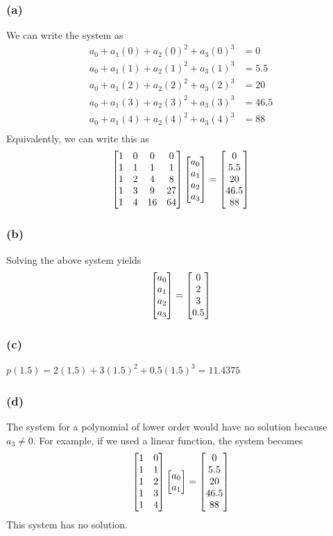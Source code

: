 \documentclass{article}
\begin{document}
\subsubsection*{(a)}
We can write the system as
\begin{align*}
a_0+a_1(0)+a_2(0)^2 +a_3(0)^3 &= 0 \\
a_0+a_1(1)+a_2(1)^2 +a_3(1)^3 &= 5.5 \\
a_0+a_1(2)+a_2(2)^2 +a_3(2)^3&= 20  \\
a_0+a_1(3)+a_2(3)^2 +a_3(3)^3 &= 46.5 \\
a_0+a_1(4)+a_2(4)^2 +a_3(4)^3 &= 88 \\ 
\end{align*}
Equivalently, we can write this as
\begin{align*}
\begin{bmatrix}
1 & 0 & 0 & 0 \\
1 & 1 &1 &1\\
1&2&4&8\\ 
1&3&9&27\\ 
1&4&16&64\\ 
 \end{bmatrix}
 \begin{bmatrix} a_0\\a_1\\a_2\\a_3 \end{bmatrix} 
 =  \begin{bmatrix} 0\\5.5\\20\\46.5\\88 \end{bmatrix} 
\end{align*}

\subsubsection*{(b)}
Solving the above system yields 
\begin{align*}
 \begin{bmatrix} a_0\\a_1\\a_2\\a_3 \end{bmatrix} 
 =  \begin{bmatrix} 0\\2\\3\\0.5 \end{bmatrix} 
\end{align*}
\subsubsection*{(c)}
$p(1.5) = 2(1.5)+3(1.5)^2+0.5(1.5)^3 = 11.4375$
\subsubsection*{(d)}
The system for a polynomial of lower order would have no solution because $a_3 \ne 0$. For example, if we used a linear function, the system becomes
\begin{align*}
\begin{bmatrix}
1&0\\
1&1\\
1&2\\ 
1&3\\ 
1&4\\ 
 \end{bmatrix}
 \begin{bmatrix} a_0\\a_1 \end{bmatrix} 
 =  \begin{bmatrix} 0\\5.5\\20\\46.5\\88 \end{bmatrix} 
\end{align*}
This system has no solution. 
\end{document}
